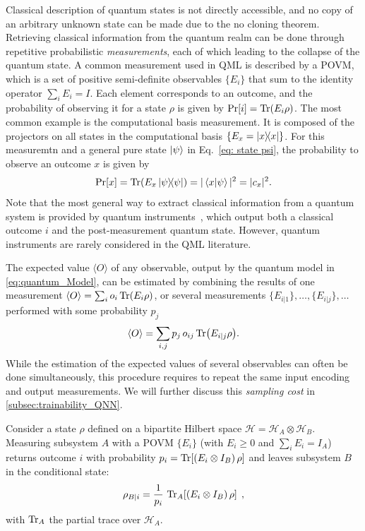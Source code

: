 \documentclass[aps,10pt,groupedaddress,prx,superscriptaddress,twocolumn,balancelastpage, tightenlines]{revtex4-2}
\theoremstyle{plain}  %
\begin{document}
Classical description of quantum states is not directly accessible, and no copy of an arbitrary unknown state can be made due to the no cloning theorem. Retrieving classical information from the quantum realm can be done through repetitive probabilistic \emph{measurements}, each of which leading to the
collapse of the quantum state. A common measurement used in QML is described by a \gls{POVM}, which
is a set of positive semi-definite observables $\{ E_i \}$ that sum to the identity operator $\sum_i E_i =I$.  Each element corresponds to an outcome, and the probability of observing it for a state $\rho$ is given by $\Pr[i] = \Tr(E_i \rho)$.  The most common example is the computational basis measurement. It is composed of the projectors on all states in the computational basis $\{E_x = \ketbra{x}\}$. For this measuremtn and a general pure state $\ket{\psi }$ in Eq.~\eqref{eq: state psi}, the probability to observe an outcome $x$ is given by 
\begin{equation}
    \Pr[x] = \Tr(E_x \ketbra{\psi}) = |\braket{x}{\psi}|^2 = |c_x|^2.
\end{equation}
Note that the most general way to extract classical information from a quantum system is provided by quantum instruments~\cite{Nielsen2011Quantum}, which output both a classical outcome $i$ and the post-measurement quantum state. However, quantum instruments are rarely considered in the QML literature.

The expected value $\langle O \rangle$ of any observable, output by the quantum model in \autoref{eq:quantum_Model}, can be estimated by combining the results of one measurement $\langle O \rangle = \sum_i o_i \Tr( E_i \rho)$, or several measurements $\{ E_{i|1} \},\dots,\{ E_{i|j} \},\dots$ performed with some probability $p_j$ 
\begin{equation}
\langle O \rangle = \sum_{i,j} p_j \, o_{ij} \Tr( E_{i|j} \rho).
\end{equation}
While the estimation of the expected values of several observables can often be done simultaneously, this procedure requires to repeat the same input encoding and output measurements. We will further discuss this {\it sampling cost} in \autoref{subsec:trainability_QNN}.


Consider a state $\rho$ defined on a bipartite Hilbert space $\mathcal{H} = \mathcal{H}_A \otimes \mathcal{H}_B$. Measuring subsystem $A$ with a POVM $\{E_i\}$ (with $E_i \geq 0$ and $\sum_i E_i = I_A$) returns outcome $i$ with probability $p_i = \Tr\!\left[(E_i \otimes I_B)\,\rho\right]$ and leaves subsystem $B$ in the conditional state:
\begin{equation}
    \rho_{B|i} = \frac{1}{p_i}\,\Tr_A\!\left[ (E_i \otimes I_B)\,\rho \right] \; ,
\end{equation}
with $\Tr_A$ the partial trace over $\mathcal{H}_A$. 
\end{document}
